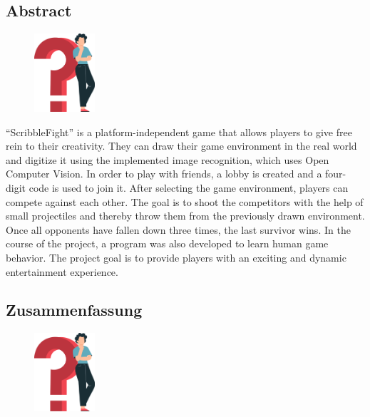 \begin{spacing}{1}
  \chapter*{Abstract}
\end{spacing}
\begin{figure}
  \begin{center}
    \includegraphics[width=0.2\textwidth]{pics/question_mark.png}
  \end{center}
\end{figure}
``ScribbleFight'' is a platform-independent game that allows players to give free rein to their creativity.
They can draw their game environment in the real world and digitize it using the implemented image recognition, which uses Open Computer Vision.
In order to play with friends, a lobby is created and a four-digit code is used to join it.
After selecting the game environment, players can compete against each other.
The goal is to shoot the competitors with the help of small projectiles and thereby throw them from the previously drawn environment.
Once all opponents have fallen down three times, the last survivor wins.
In the course of the project, a program was also developed to learn human game behavior.
The project goal is to provide players with an exciting and dynamic entertainment experience.
\newpage
\begin{spacing}{1}
  \chapter*{Zusammenfassung}
\end{spacing}
\begin{figure}
  \begin{center}
    \includegraphics[width=0.2\textwidth]{pics/question_mark.png}
  \end{center}
\end{figure}
